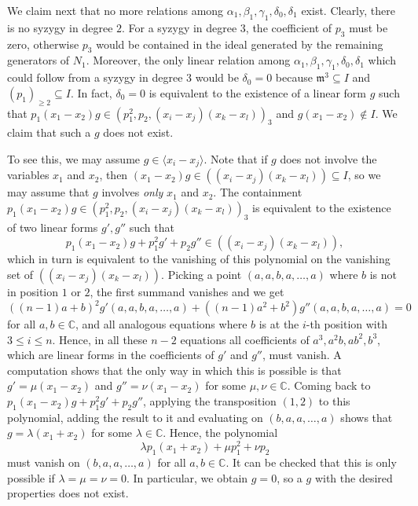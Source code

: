 \documentclass[11pt]{amsart}
\theoremstyle{definition}
\newcommand{\CC}{\mathbb{C}}
\newcommand{\mm}{\mathfrak{m}}
\begin{document}
We claim next that no more relations among $\alpha_1,\beta_1,\gamma_1,\delta_0,\delta_1$ exist. Clearly, there is no syzygy in degree $2$. For a syzygy in degree $3$, the coefficient of $p_3$ must be zero, otherwise $p_3$ would be contained in the ideal generated by the remaining generators of $N_1$. Moreover, the only linear relation among $\alpha_1,\beta_1,\gamma_1,\delta_0,\delta_1$ which could follow from a syzygy in degree $3$ would be $\delta_0 = 0$ because $\mm^3 \subseteq I$ and $(p_1)_{\geq 2} \subseteq I$. In fact, $\delta_0 = 0$ is equivalent to the existence of a linear form $g$ such that $p_1(x_1-x_2)g \in (p_1^2, p_2, (x_i-x_j)(x_k-x_l))_3$ and $g(x_1-x_2) \not\in I$. We claim that such a $g$ does not exist.

To see this, we may assume $g \in \langle x_i - x_j \rangle$. Note that if $g$ does not involve the variables $x_1$ and $x_2$, then $(x_1-x_2)g \in ((x_i-x_j)(x_k-x_l)) \subseteq I$, so we may assume that $g$ involves \emph{only} $x_1$ and $x_2$. The containment $p_1(x_1-x_2)g \in (p_1^2, p_2, (x_i-x_j)(x_k-x_l))_3$ is equivalent to the existence of two linear forms $g',g''$ such that
\begin{equation*}
    p_1(x_1-x_2)g + p_1^2g' + p_2 g'' \in ((x_i-x_j)(x_k-x_l)),
\end{equation*}
which in turn is equivalent to the vanishing of this polynomial on the vanishing set of $((x_i-x_j)(x_k-x_l))$. Picking a point $(a,a,b,a,\ldots,a)$ where $b$ is not in position $1$ or $2$, the first summand vanishes and we get
\begin{equation*}
    ((n-1)a+b)^2g'(a,a,b,a,\ldots,a) + ((n-1)a^2+b^2)g''(a,a,b,a,\ldots,a) = 0
\end{equation*}
for all $a,b \in \CC$, and all analogous equations where $b$ is at the $i$-th position with $3 \leq i \leq n$. Hence, in all these $n-2$ equations all coefficients of $a^3,a^2b,ab^2,b^3$, which are linear forms in the coefficients of $g'$ and $g''$, must vanish. A computation shows that the only way in which this is possible is that $g' = \mu (x_1-x_2)$ and $g'' = \nu (x_1-x_2)$ for some $\mu, \nu \in \CC$. Coming back to $p_1(x_1-x_2)g + p_1^2g' + p_2 g''$, applying the transposition $(1,2)$ to this polynomial, adding the result to it and evaluating on $(b,a,a,\ldots,a)$ shows that $g = \lambda (x_1 + x_2)$ for some $\lambda \in \CC$. Hence, the polynomial
\begin{equation*}
    \lambda p_1 (x_1+x_2) + \mu p_1^2 + \nu p_2
\end{equation*}
must vanish on $(b,a,a,\ldots,a)$ for all $a,b \in \CC$. It can be checked that this is only possible if $\lambda = \mu = \nu = 0$. In particular, we obtain $g = 0$, so a $g$ with the desired properties does not exist.
\end{document}
